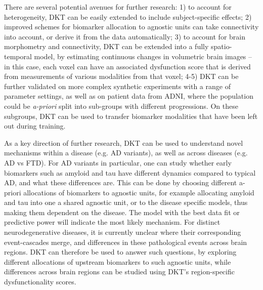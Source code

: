 \documentclass{llncs}
\begin{document}
There are several potential avenues for further research: 1) to account for heterogeneity, DKT can be easily extended to include subject-specific effects; 2) improved schemes for biomarker allocation to agnostic units can take connectivity into account, or derive it from the data automatically; 3) to account for brain morphometry and connectivity, DKT can be extended into a fully spatio-temporal model, by estimating continuous changes in volumetric brain images -- in this case, each voxel can have an associated dysfunction score that is derived from measurements of various modalities from that voxel; 4-5) DKT can be further validated on more complex synthetic experiments with a range of parameter settings, as well as on patient data from ADNI, where the population could be \emph{a-priori} split into sub-groups with different progressions. On these subgroups, DKT can be used to transfer biomarker modalities that have been left out during training.

As a key direction of further research, DKT can be used to understand novel mechanisms within a disease (e.g. AD variants), as well as across diseases (e.g. AD vs FTD). For AD variants in particular, one can study whether early biomarkers such as amyloid and tau have different dynamics compared to typical AD, and what these differences are. This can be done by choosing different a-priori allocations of biomarkers to agnostic units, for example allocating amyloid and tau into one a shared agnostic unit, or to the disease specific models, thus making them dependent on the disease. The model with the best data fit or predictive power will indicate the most likely mechanism. For distinct neurodegenerative diseases, it is currently unclear where their corresponding event-cascades merge, and differences in these pathological events across brain regions. DKT can therefore be used to answer such questions, by exploring different allocations of upstream biomarkers to such agnostic units, while differences across brain regions can be studied using DKT's region-specific dysfunctionality scores.

%
\end{document}
